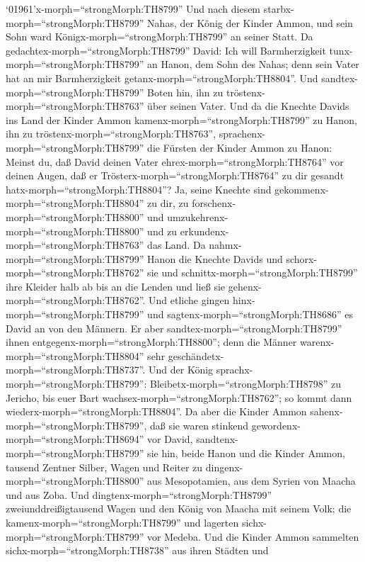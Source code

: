  `01961'\textbar x-morph=``strongMorph:TH8799'' Und nach
diesem starbx-morph=``strongMorph:TH8799'' Nahas, der König der Kinder
Ammon, und sein Sohn ward Königx-morph=``strongMorph:TH8799'' an seiner
Statt.  Da gedachtex-morph=``strongMorph:TH8799'' David: Ich
will Barmherzigkeit tunx-morph=``strongMorph:TH8799'' an Hanon, dem Sohn
des Nahas; denn sein Vater hat an mir Barmherzigkeit
getanx-morph=``strongMorph:TH8804''. Und
sandtex-morph=``strongMorph:TH8799'' Boten hin, ihn zu
tröstenx-morph=``strongMorph:TH8763'' über seinen Vater. Und da die
Knechte Davids ins Land der Kinder Ammon
kamenx-morph=``strongMorph:TH8799'' zu Hanon, ihn zu
tröstenx-morph=``strongMorph:TH8763'', 
sprachenx-morph=``strongMorph:TH8799'' die Fürsten der Kinder Ammon zu
Hanon: Meinst du, daß David deinen Vater
ehrex-morph=``strongMorph:TH8764'' vor deinen Augen, daß er
Trösterx-morph=``strongMorph:TH8764'' zu dir gesandt
hatx-morph=``strongMorph:TH8804''? Ja, seine Knechte sind
gekommenx-morph=``strongMorph:TH8804'' zu dir, zu
forschenx-morph=``strongMorph:TH8800'' und
umzukehrenx-morph=``strongMorph:TH8800'' und zu
erkundenx-morph=``strongMorph:TH8763'' das Land.  Da
nahmx-morph=``strongMorph:TH8799'' Hanon die Knechte Davids und
schorx-morph=``strongMorph:TH8762'' sie und
schnittx-morph=``strongMorph:TH8799'' ihre Kleider halb ab bis an die
Lenden und ließ sie gehenx-morph=``strongMorph:TH8762''. 
Und etliche gingen hinx-morph=``strongMorph:TH8799'' und
sagtenx-morph=``strongMorph:TH8686'' es David an von den Männern. Er
aber sandtex-morph=``strongMorph:TH8799'' ihnen
entgegenx-morph=``strongMorph:TH8800''; denn die Männer
warenx-morph=``strongMorph:TH8804'' sehr
geschändetx-morph=``strongMorph:TH8737''. Und der König
sprachx-morph=``strongMorph:TH8799'':
Bleibetx-morph=``strongMorph:TH8798'' zu Jericho, bis euer Bart
wachsex-morph=``strongMorph:TH8762''; so kommt dann
wiederx-morph=``strongMorph:TH8804''.  Da aber die Kinder
Ammon sahenx-morph=``strongMorph:TH8799'', daß sie waren stinkend
gewordenx-morph=``strongMorph:TH8694'' vor David,
sandtenx-morph=``strongMorph:TH8799'' sie hin, beide Hanon und die
Kinder Ammon, tausend Zentner Silber, Wagen und Reiter zu
dingenx-morph=``strongMorph:TH8800'' aus Mesopotamien, aus dem Syrien
von Maacha und aus Zoba.  Und
dingtenx-morph=``strongMorph:TH8799'' zweiunddreißigtausend Wagen und
den König von Maacha mit seinem Volk; die
kamenx-morph=``strongMorph:TH8799'' und lagerten
sichx-morph=``strongMorph:TH8799'' vor Medeba. Und die Kinder Ammon
sammelten sichx-morph=``strongMorph:TH8738'' aus ihren Städten und
